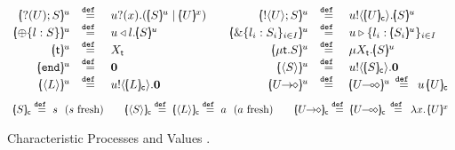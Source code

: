 \begin{figure}[t]
\[
	\begin{array}{rclcrcl}
		\mapchar{\btinp{U} S}{u}
		&\defeq&
		\binp{u}{x} (\mapchar{S}{u} \Par \mapchar{U}{x})
		&&
		\mapchar{\btout{U} S}{u}
		&\defeq&
		\bout{u}{\omapchar{U}} \mapchar{S}{u} %
		\\

		\mapchar{\btsel{l : S}}{u}
		& \defeq &
		\bsel{u}{l} \mapchar{S}{u}
		&&
		\mapchar{\btbra{l_i: S_i}_{i \in I}}{u}
		& \defeq &
		\bbra{u}{l_i: \mapchar{S_i}{u}}_{i \in I}
		\\

		\mapchar{\tvar{t}}{u}
		&\defeq&
		\varp{X}_{\vart{t}}
		& & 
		\mapchar{\trec{t}{S}}{u}
		&\defeq&
		\recp{X_{\vart{t}}}{\mapchar{S}{u}}
		\\

		\mapchar{\tinact}{u}
		& \defeq &
		\inact
		& & 
		\mapchar{\chtype{S}}{u} 
		&\defeq&
		\bout{u}{\omapchar{S}} \inact
		\\

		\mapchar{\chtype{L}}{u}
		&\defeq&
		\bout{u}{\omapchar{L}} \inact
		&&
		\mapchar{\shot{U}}{u}
		&\defeq &
		\mapchar{\lhot{U}}{u}
		\, \defeq \,
		\appl{u}{\omapchar{U}}
		\end{array}
		\]
		\vspace{-3mm}
		\[
		\begin{array}{c}
		\omapchar{S}  \defeq  s ~~ (s \textrm{ fresh})
		\qquad
		\omapchar{\chtype{S}} \defeq \omapchar{\chtype{L}} \defeq a ~~ (a \textrm{ fresh})
		\qquad
		\omapchar{\shot{U}} \defeq \omapchar{\lhot{U}} \,\defeq\, \abs{x}{\mapchar{U}{x}}
	\end{array}
\]
\vspace{-5mm}
\caption{Characteristic Processes  and Values .\label{fig:char}}
\end{figure}



